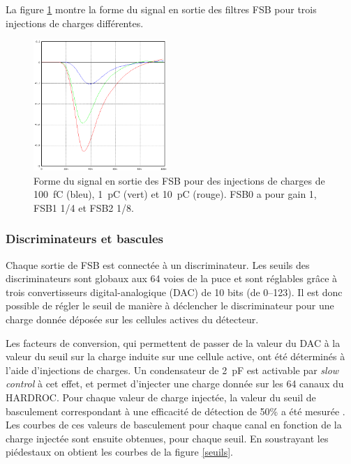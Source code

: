 La figure \ref{signal} montre la forme du signal en sortie des filtres FSB pour trois injections de charges différentes.
\begin{figure}[ht!]
	\centering
	\includegraphics[width=0.45\textwidth]{GLA/SIGNAL.png}
	\captionsetup{type=figure}\caption{Forme du signal en sortie des FSB pour des injections de charges de \SI{100}{\femto\coulomb} (bleu), \SI{1}{\pico\coulomb} (vert) et \SI{10}{\pico\coulomb} (rouge). FSB0 a pour gain \num{1}, FSB1 1/4 et FSB2 1/8.}
	\label{signal}
\end{figure}

\vspace*{-1.2cm}

\subsubsection{Discriminateurs et bascules}
Chaque sortie de FSB est connectée à un discriminateur. Les seuils des discriminateurs sont globaux aux \num{64} voies de la puce et sont réglables grâce à trois convertisseurs digital-analogique (DAC) de \num{10} bits (de \SIrange{0}{123}{}). Il est donc possible de régler le seuil de manière à déclencher le discriminateur pour une charge donnée déposée sur les cellules actives du détecteur.

Les facteurs de conversion, qui permettent de passer de la valeur du DAC à la valeur du seuil sur la charge induite sur une cellule active, ont été déterminés à l'aide d'injections de charges. Un condensateur de \SI{2}{\pico\farad} est activable par \textit{slow control} à cet effet, et permet d'injecter une charge donnée sur les \num{64} canaux du HARDROC. Pour chaque valeur de charge injectée, la valeur du seuil de basculement correspondant à une efficacité de détection de 50\% a été mesurée \cite{kieffer:tel-00751999}. Les courbes de ces valeurs de basculement pour chaque canal en fonction de la charge injectée sont ensuite obtenues, pour chaque seuil. En soustrayant les piédestaux on obtient les courbes de la figure \ref{seuils}.

